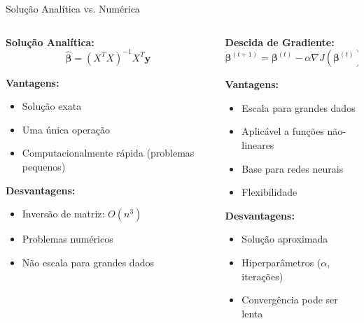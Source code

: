 \documentclass[xcolor=dvipsnames,t,aspectratio=169]{beamer} %
\begin{document}
\begin{frame}[c]{Solução Analítica vs. Numérica}
    \begin{columns}[c]
        \begin{column}{0.5\textwidth}
            \textbf{Solução Analítica:}
            \begin{equation}
                \hat{\boldsymbol{\beta}} = (X^TX)^{-1}X^T\mathbf{y}
            \end{equation}
            
            \textbf{Vantagens:}
            \begin{itemize}
                \item Solução exata
                \item Uma única operação
                \item Computacionalmente rápida (problemas pequenos)
            \end{itemize}
            
            \textbf{Desvantagens:}
            \begin{itemize}
                \item Inversão de matriz: $O(n^3)$
                \item Problemas numéricos
                \item Não escala para grandes dados
            \end{itemize}
        \end{column}
        \begin{column}{0.5\textwidth}
            \textbf{Descida de Gradiente:}
            \begin{equation}
                \boldsymbol{\beta}^{(t+1)} = \boldsymbol{\beta}^{(t)} - \alpha \nabla J(\boldsymbol{\beta}^{(t)})
            \end{equation}
            
            \textbf{Vantagens:}
            \begin{itemize}
                \item Escala para grandes dados
                \item Aplicável a funções não-lineares
                \item Base para redes neurais
                \item Flexibilidade
            \end{itemize}
            
            \textbf{Desvantagens:}
            \begin{itemize}
                \item Solução aproximada
                \item Hiperparâmetros ($\alpha$, iterações)
                \item Convergência pode ser lenta
            \end{itemize}
        \end{column}
    \end{columns}
\end{frame}
\end{document}
